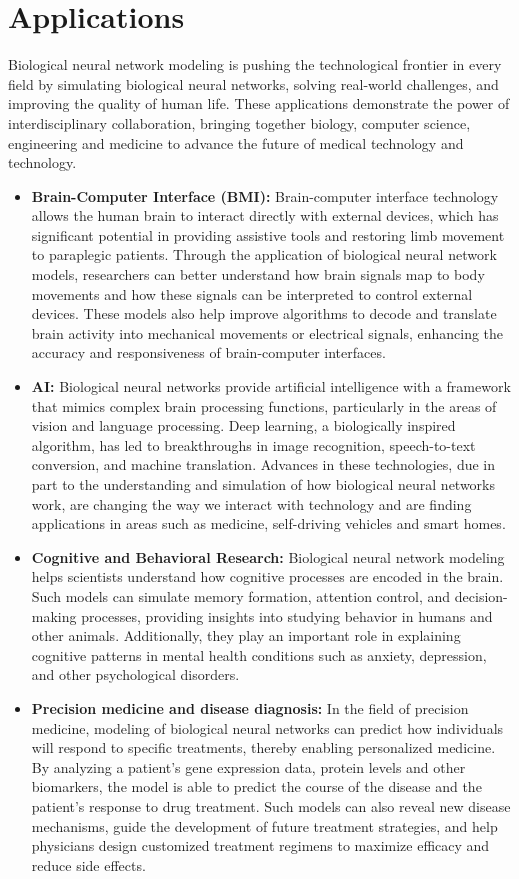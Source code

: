 \documentclass[12pt,a4paper]{report}
\begin{document}
\chapter{Applications}
Biological neural network modeling is pushing the technological frontier in every field by simulating biological neural networks, solving real-world challenges, and improving the quality of human life. These applications demonstrate the power of interdisciplinary collaboration, bringing together biology, computer science, engineering and medicine to advance the future of medical technology and technology.

\begin{itemize}
    \item \textbf{ Brain-Computer Interface (BMI):} Brain-computer interface technology allows the human brain to interact directly with external devices, which has significant potential in providing assistive tools and restoring limb movement to paraplegic patients. Through the application of biological neural network models, researchers can better understand how brain signals map to body movements and how these signals can be interpreted to control external devices. These models also help improve algorithms to decode and translate brain activity into mechanical movements or electrical signals, enhancing the accuracy and responsiveness of brain-computer interfaces.
    \item \textbf{AI:} Biological neural networks provide artificial intelligence with a framework that mimics complex brain processing functions, particularly in the areas of vision and language processing. Deep learning, a biologically inspired algorithm, has led to breakthroughs in image recognition, speech-to-text conversion, and machine translation. Advances in these technologies, due in part to the understanding and simulation of how biological neural networks work, are changing the way we interact with technology and are finding applications in areas such as medicine, self-driving vehicles and smart homes.
    \item \textbf{Cognitive and Behavioral Research:} Biological neural network modeling helps scientists understand how cognitive processes are encoded in the brain. Such models can simulate memory formation, attention control, and decision-making processes, providing insights into studying behavior in humans and other animals. Additionally, they play an important role in explaining cognitive patterns in mental health conditions such as anxiety, depression, and other psychological disorders.
    \item \textbf{Precision medicine and disease diagnosis:} In the field of precision medicine, modeling of biological neural networks can predict how individuals will respond to specific treatments, thereby enabling personalized medicine. By analyzing a patient's gene expression data, protein levels and other biomarkers, the model is able to predict the course of the disease and the patient's response to drug treatment. Such models can also reveal new disease mechanisms, guide the development of future treatment strategies, and help physicians design customized treatment regimens to maximize efficacy and reduce side effects.
\end{itemize}
\end{document}
